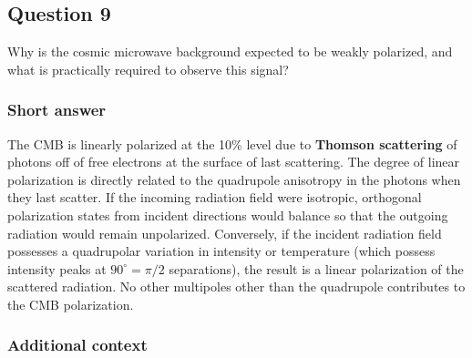 \documentclass[a4paper,11pt]{article}
\begin{document}
\newpage
\subsection{Question 9}

Why is the cosmic microwave background expected to be weakly polarized, and what is practically required to observe this signal?

\subsubsection{Short answer}

The CMB is linearly polarized at the 10\% level due to \textbf{Thomson scattering} of photons off of free electrons at the surface of last scattering.  The degree of linear polarization is directly related to the quadrupole anisotropy in the photons when they last scatter. If the incoming radiation field were isotropic, orthogonal polarization states from incident directions would balance so that the outgoing radiation would remain unpolarized. Conversely, if the incident radiation field possesses a quadrupolar variation in intensity or temperature (which possess intensity peaks at $90^\circ=\pi/2$ separations), the result is a linear polarization of the scattered radiation. No other multipoles other than the quadrupole contributes to the CMB polarization.

\subsubsection{Additional context}
\end{document}
